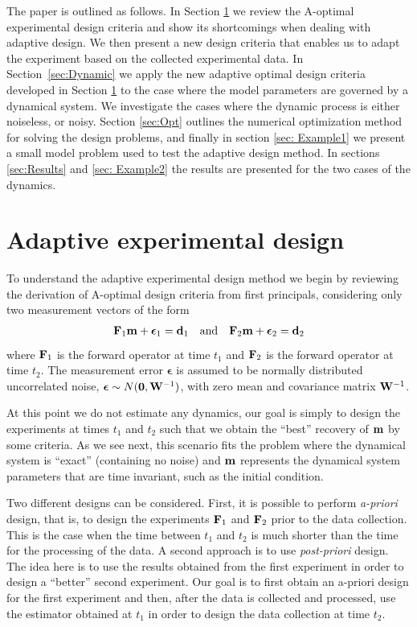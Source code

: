 \documentclass[11pt]{article}
\newcommand{\bfF}	{{\bf{F}}}
\newcommand{\bfW}	{{\bf{W}}}
\newcommand{\bfd}	{{\bf{d}}}
\newcommand{\bfm}	{{\bf{m}}}
\newcommand{\bfepsilon} {{\boldsymbol \epsilon}}
\newcommand {\zero}  { {\bf 0} }
\begin{document}
\bigskip


The paper is outlined as follows. In Section \ref{sec: Adaptive} we review the A-optimal experimental design
criteria and show its shortcomings when dealing with adaptive design.  We then present a new
design criteria that enables us to adapt the experiment based on the collected experimental data.
In Section~\ref{sec:Dynamic} we apply the new adaptive optimal design criteria developed in Section \ref{sec: Adaptive}
to the case where the model parameters are governed by a dynamical system. We investigate the cases where the dynamic process is either noiseless, or noisy. 
Section \ref{sec:Opt}  outlines the numerical optimization method for solving the design problems, and finally in section \ref{sec: Example1} we present a small model problem used to test the adaptive design method. In sections \ref{sec:Results} and \ref{sec: Example2} the results are presented for the two cases of the dynamics. 




\section{ Adaptive experimental design }
\label{sec: Adaptive}
To understand the adaptive experimental design method we  begin by reviewing the derivation of A-optimal
 design criteria from first principals, considering only two measurement vectors  of the form
\begin{align}
\label{data}
\bfF_{1} \bfm + \bfepsilon_1 = \bfd_{1}\quad {\rm and} \quad \bfF_{2} \bfm + \bfepsilon_2 = \bfd_{2}
\end{align}
where $\bfF_{1}$ is the forward operator at time $t_{1}$ and $\bfF_{2}$ is the forward operator 
at time $t_{2}$. The measurement error $\bfepsilon$ is assumed to be normally distributed uncorrelated noise, $ \bfepsilon\sim N(\zero,\bfW^{-1})$, with zero mean and covariance matrix $\bfW^{-1}$. 

At this point we do not estimate any dynamics,
our goal is simply to design the experiments at times $t_{1}$ and $t_{2}$ such that we obtain the ``best''
recovery of $\bfm$ by some criteria.
As we see next, this scenario fits the problem where the dynamical system is ``exact'' (containing
no noise) and $\bfm$ represents the dynamical system parameters that are time invariant, such as the initial condition.

Two different designs can be considered. First, it is possible to perform {\em a-priori} design, that is,
to design the experiments $\bfF_{1}$ and $\bfF_{2}$ prior to the data collection. This is the case
when the time between $t_{1}$ and $t_{2}$ is much shorter than the time for the processing
of the data. A second approach is to use {\em post-priori} design. The idea here is to use the 
results obtained from the first experiment in order to design a ``better'' second experiment.
Our goal is to first obtain an a-priori design for the first experiment
and then, after the data is collected and processed, use the estimator
obtained at $t_{1}$ in order  to design the data collection
at time $t_{2}$.
\end{document}

